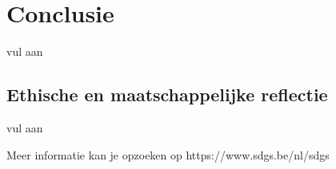 \chapter*{Conclusie}

vul aan

\section*{Ethische en maatschappelijke reflectie}
vul aan

Meer informatie kan je opzoeken op https://www.sdgs.be/nl/sdgs 